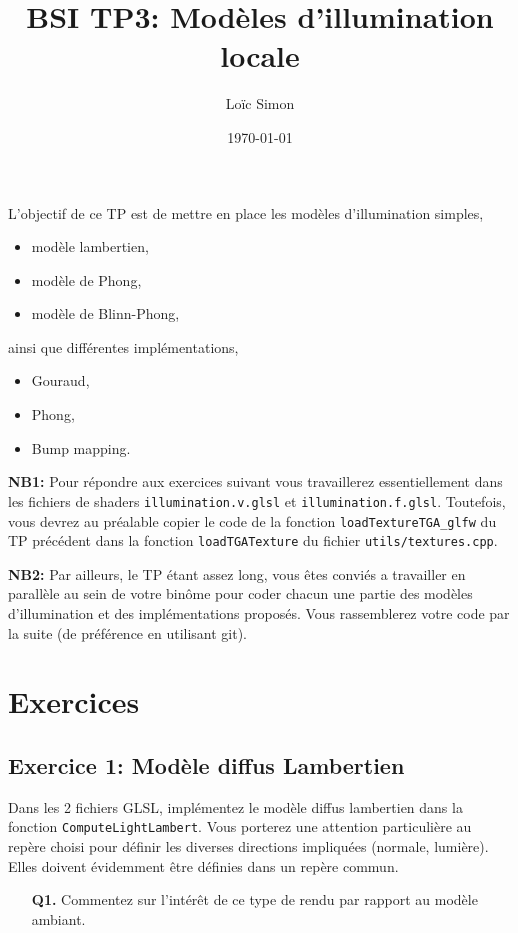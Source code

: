 \documentclass{article}
\author{Loïc Simon}
\title{BSI TP3: Modèles d'illumination locale}
\date{\today}
\begin{document}
\maketitle

L'objectif de ce TP est de mettre en place les modèles d'illumination simples,
\begin{itemize}
  \item modèle lambertien,
  \item modèle de Phong,
  \item modèle de Blinn-Phong,
\end{itemize}

ainsi que différentes implémentations,
\begin{itemize}
\item Gouraud,
\item Phong,
\item Bump mapping.
\end{itemize}

{\bf NB1:} Pour répondre aux exercices suivant vous travaillerez essentiellement dans les
fichiers de shaders \verb|illumination.v.glsl| et \verb|illumination.f.glsl|.
Toutefois, vous devrez au préalable copier le code de la fonction
\verb|loadTextureTGA_glfw| du TP précédent dans la fonction
\verb|loadTGATexture| du fichier \verb|utils/textures.cpp|.

{\bf NB2:} Par ailleurs, le TP étant assez long, vous êtes conviés a travailler
en parallèle au sein de votre binôme pour coder chacun une partie des modèles
d'illumination et des implémentations proposés. Vous rassemblerez votre code par la
suite (de préférence en utilisant git).

\section{Exercices}

\subsection{Exercice 1: Modèle diffus Lambertien}%

Dans les 2 fichiers GLSL, implémentez le modèle diffus lambertien dans la
fonction \verb|ComputeLightLambert|. Vous porterez une attention particulière au
repère choisi pour définir les diverses directions impliquées (normale,
lumière). Elles doivent évidemment être définies dans un repère commun.
\begin{itemize}
  \item[{\bf Q1.}] Commentez sur l'intérêt de ce type de rendu par rapport au modèle ambiant.
\end{itemize}
\end{document}
